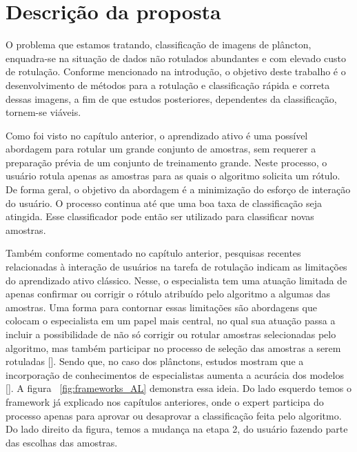 \chapter{Descrição da proposta}
\label{cap:Proposta}

O problema que estamos tratando, classificação de imagens de plâncton, enquadra-se na situação de dados não rotulados abundantes e com elevado custo de rotulação. Conforme mencionado na introdução, o objetivo deste trabalho é o desenvolvimento de métodos para a rotulação e classificação rápida e correta dessas imagens, a fim de que estudos posteriores, dependentes da classificação, tornem-se viáveis. 

Como foi visto no capítulo anterior, o aprendizado ativo é uma possível abordagem para rotular um grande conjunto de amostras, sem requerer a preparação prévia de um conjunto de treinamento grande. Neste processo, o usuário rotula apenas as amostras para as quais o algoritmo solicita um rótulo. De forma geral, o objetivo da abordagem é a minimização do esforço de interação do usuário. O processo continua até que uma boa taxa de classificação seja atingida. Esse classificador pode então ser utilizado para classificar novas amostras. 

Também conforme comentado no capítulo anterior, pesquisas recentes relacionadas à interação de usuários na tarefa de rotulação indicam as limitações do aprendizado ativo clássico. Nesse, o especialista tem uma atuação limitada de apenas confirmar ou corrigir o rótulo atribuído pelo algoritmo a algumas das amostras. Uma forma para contornar essas limitações são abordagens que colocam o especialista em um papel mais central, no qual sua atuação passa a incluir a possibilidade de não só corrigir ou rotular amostras selecionadas pelo algoritmo, mas também participar no processo de seleção das amostras a serem rotuladas [\cite{castro2009human, kottke2018other}]. Sendo que, no caso dos plânctons, estudos mostram que a incorporação de conhecimentos de especialistas aumenta a acurácia dos modelos [\cite{benfield2007rapid}]. A figura ~\ref{fig:frameworks_AL} demonstra essa ideia. Do lado esquerdo temos o framework já explicado nos capítulos anteriores, onde o expert participa do processo apenas para aprovar ou desaprovar a classificação feita pelo algoritmo. Do lado direito da figura, temos a mudança na etapa 2, do usuário fazendo parte das escolhas das amostras.

